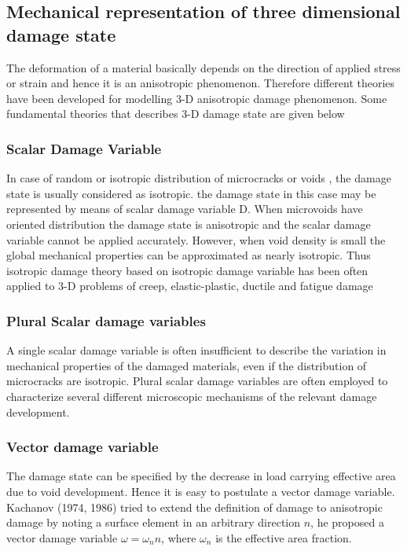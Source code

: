 \documentclass[a4paper,14pt]{extarticle}
\begin{document}
\subsection{Mechanical representation of three dimensional damage state}
\indent\indent\indent The deformation of a material basically depends on the direction of applied stress or strain and hence it is an anisotropic phenomenon. Therefore different theories have been developed for modelling 3-D anisotropic damage phenomenon. Some fundamental theories that describes 3-D damage state are given below 
\subsubsection{Scalar Damage Variable}
\indent\indent\indent In case of random or isotropic distribution of microcracks or voids , the damage state is usually considered as isotropic. the damage state in this case may be represented by means of scalar damage variable D. When microvoids  have oriented distribution the damage state is anisotropic and the scalar damage variable cannot be applied accurately. However, when void density is small the global mechanical properties can be approximated as nearly isotropic. Thus isotropic damage theory based on isotropic damage variable has been often applied to 3-D problems of creep, elastic-plastic, ductile and fatigue damage
\subsubsection{Plural Scalar damage variables}
\indent\indent\indent A single scalar damage variable is often insufficient to describe the variation in mechanical properties of the damaged materials, even if the distribution of microcracks are isotropic. Plural scalar damage variables are often employed to characterize several different microscopic mechanisms of the relevant damage development.
\subsubsection{Vector damage variable}
\indent\indent\indent The damage state can be specified by the decrease in load carrying effective area due to void development. Hence it is easy to postulate a vector damage variable. Kachanov (1974, 1986) tried to extend the definition of damage to anisotropic damage by noting a surface element in an arbitrary direction $n$, he proposed a vector damage variable $ \omega = \omega_{n}n$, where $\omega_{n}$ is the effective area fraction. 
\end{document}
